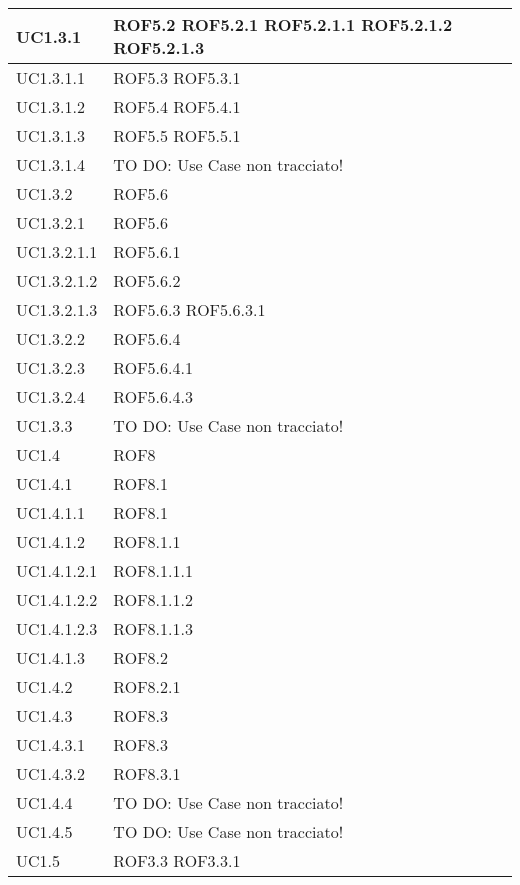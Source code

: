 \begin{center}
\begin{longtable}{| p{4cm} | p{4cm} |}
\hline
UC1.3.1 & ROF5.2 \newline ROF5.2.1 \newline ROF5.2.1.1 \newline ROF5.2.1.2 \newline ROF5.2.1.3 \\
\hline
UC1.3.1.1 & ROF5.3 \newline ROF5.3.1 \\
\hline
UC1.3.1.2 & ROF5.4 \newline ROF5.4.1 \\
\hline
UC1.3.1.3 & ROF5.5 \newline ROF5.5.1 \\
\hline
UC1.3.1.4 & TO DO: Use Case non tracciato! \\
\hline
UC1.3.2 & ROF5.6 \\
\hline
UC1.3.2.1 & ROF5.6 \\
\hline
UC1.3.2.1.1 & ROF5.6.1 \\
\hline
UC1.3.2.1.2 & ROF5.6.2 \\
\hline
UC1.3.2.1.3 & ROF5.6.3 \newline ROF5.6.3.1 \\
\hline
UC1.3.2.2 & ROF5.6.4 \\
\hline
UC1.3.2.3 & ROF5.6.4.1 \\
\hline
UC1.3.2.4 & ROF5.6.4.3 \\
\hline
UC1.3.3 & TO DO: Use Case non tracciato! \\
\hline
UC1.4 & ROF8 \\
\hline
UC1.4.1 & ROF8.1 \\
\hline
UC1.4.1.1 & ROF8.1 \\
\hline
UC1.4.1.2 & ROF8.1.1 \\
\hline
UC1.4.1.2.1 & ROF8.1.1.1 \\
\hline
UC1.4.1.2.2 & ROF8.1.1.2 \\
\hline
UC1.4.1.2.3 & ROF8.1.1.3 \\
\hline
UC1.4.1.3 & ROF8.2 \\
\hline
UC1.4.2 & ROF8.2.1 \\
\hline
UC1.4.3 & ROF8.3 \\
\hline
UC1.4.3.1 & ROF8.3 \\
\hline
UC1.4.3.2 & ROF8.3.1 \\
\hline
UC1.4.4 & TO DO: Use Case non tracciato! \\
\hline
UC1.4.5 & TO DO: Use Case non tracciato! \\
\hline
UC1.5 & ROF3.3 \newline ROF3.3.1 \\

\end{longtable}
\end{center}
